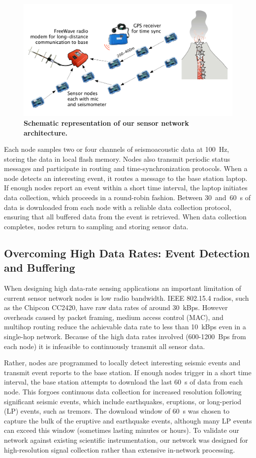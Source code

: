 \begin{figure}[t]
\begin{center}
\includegraphics[width=0.7\hsize]{./3-evaluation/figs/architecture.pdf}
\end{center}
\caption{\textbf{Schematic representation of our sensor network
architecture.}}
\label{evaluation-fig-architecture}
\end{figure}

Each node samples two or four channels of seismoacoustic data at 100~Hz,
storing the data in local flash memory. Nodes also transmit periodic status
messages and participate in routing and time-synchronization protocols. When
a node detects an interesting event, it routes a message to the base station
laptop. If enough nodes report an event within a short time interval, the
laptop initiates data collection, which proceeds in a round-robin fashion.
Between 30~and~60~s of data is downloaded from each node with a reliable data
collection protocol, ensuring that all buffered data from the event is
retrieved. When data collection completes, nodes return to sampling and
storing sensor data.

\subsection{Overcoming High Data Rates: Event Detection and Buffering}

When designing high data-rate sensing applications an important limitation of
current sensor network nodes is low radio bandwidth. IEEE 802.15.4 radios,
such as the Chipcon CC2420, have raw data rates of around 30~kBps. However
overheads caused by packet framing, medium access control (MAC), and multihop
routing reduce the achievable data rate to less than 10~kBps even in a
single-hop network. Because of the high data rates involved (600-1200~Bps
from each node) it is infeasible to continuously transmit all sensor data.

Rather, nodes are programmed to locally detect interesting seismic events and
transmit event reports to the base station. If enough nodes trigger in a
short time interval, the base station attempts to download the last 60~s of
data from each node. This forgoes continuous data collection for increased
resolution following significant seismic events, which include earthquakes,
eruptions, or long-period (LP) events, such as tremors. The download window
of 60~s was chosen to capture the bulk of the eruptive and earthquake events,
although many LP events can exceed this window (sometimes lasting minutes or
hours). To validate our network against existing scientific instrumentation,
our network was designed for high-resolution signal collection rather than
extensive in-network processing.

